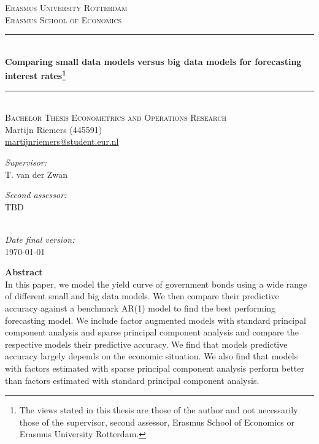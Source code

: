 \begin{titlepage}	
	\begin{center}
		\textsc{\Large{Erasmus University Rotterdam}} \\[.7cm]
		\textsc{Erasmus School of Economics} \\[0.5cm]
		
		\rule{\linewidth}{0.5mm} \\[0.4cm]
		\huge{\bfseries{Comparing small data models versus big data models for forecasting interest rates\footnote{The views stated in this thesis are those of the author and not necessarily those of the supervisor, second assessor, Erasmus School of Economics or Erasmus University Rotterdam.}}} \\
		\rule{\linewidth}{0.5mm} \\[.5cm]
		
		\textsc{\large{Bachelor Thesis Econometrics and Operations Research}} \\[.5cm]
		
		\large{Martijn Riemers (445591)} \\
		\large{\href{mailto:martijnriemers@student.eur.nl}{martijnriemers@student.eur.nl}} \\[.75cm]	
		
		\begin{minipage}[t]{0.4\textwidth}
		\center
		\large{\emph{Supervisor:}}\\
		\large{T. van der Zwan}
		\end{minipage}
		\begin{minipage}[t]{0.4\textwidth}
		\center
		\large{\emph{Second assessor:}} \\
		\large{TBD}
		\end{minipage}\\[.75cm]
		
		\large{\emph{Date final version:}} \\
		\large{\today} \\[4cm]
	\end{center}
		
		
	{\setlength{\parindent}{0cm}
	\textbf{Abstract} \\
	In this paper, we model the yield curve of government bonds using a wide range of different small and big data models. 
	We then compare their predictive accuracy against a benchmark AR(1) model to find the best performing forecasting model. 
	We include factor augmented models with standard principal component analysis and sparse principal component analysis and compare the respective models their predictive accuracy. 
	We find that models predictive accuracy largely depends on the economic situation. 
	We also find that models with factors estimated with sparse principal component analysis perform better than factors estimated with standard principal component analysis. 
	}
\end{titlepage}